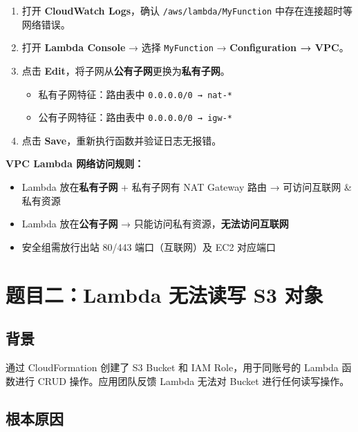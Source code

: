 \documentclass[12pt, a4paper]{article}
\begin{document}
\begin{solution}
\begin{enumerate}
    \item 打开 \textbf{CloudWatch Logs}，确认 \texttt{/aws/lambda/MyFunction} 中存在连接超时等网络错误。
    \item 打开 \textbf{Lambda Console} → 选择 \texttt{MyFunction} → \textbf{Configuration → VPC}。
    \item 点击 \textbf{Edit}，将子网从\textbf{公有子网}更换为\textbf{私有子网}。
    \begin{itemize}
        \item 私有子网特征：路由表中 \texttt{0.0.0.0/0 → nat-*}
        \item 公有子网特征：路由表中 \texttt{0.0.0.0/0 → igw-*}
    \end{itemize}
    \item 点击 \textbf{Save}，重新执行函数并验证日志无报错。
\end{enumerate}
\end{solution}

\begin{keypoint}
\textbf{VPC Lambda 网络访问规则：}
\begin{itemize}
    \item Lambda 放在\textbf{私有子网} + 私有子网有 NAT Gateway 路由 → 可访问互联网 \& 私有资源
    \item Lambda 放在\textbf{公有子网} → 只能访问私有资源，\textbf{无法访问互联网}
    \item 安全组需放行出站 80/443 端口（互联网）及 EC2 对应端口
\end{itemize}
\end{keypoint}

\newpage
\section{题目二：Lambda 无法读写 S3 对象}

\subsection{背景}

通过 CloudFormation 创建了 S3 Bucket 和 IAM Role，用于同账号的 Lambda 函数进行 CRUD 操作。应用团队反馈 Lambda 无法对 Bucket 进行任何读写操作。

\subsection{根本原因}
\end{document}
